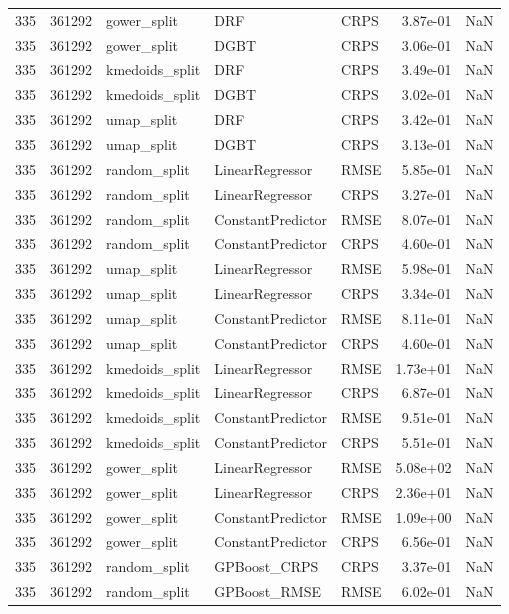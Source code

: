 \begin{tabular}{rrlllrr}
335 & 361292 & gower\_split & DRF & CRPS & 3.87e-01 & NaN \\
335 & 361292 & gower\_split & DGBT & CRPS & 3.06e-01 & NaN \\
335 & 361292 & kmedoids\_split & DRF & CRPS & 3.49e-01 & NaN \\
335 & 361292 & kmedoids\_split & DGBT & CRPS & 3.02e-01 & NaN \\
335 & 361292 & umap\_split & DRF & CRPS & 3.42e-01 & NaN \\
335 & 361292 & umap\_split & DGBT & CRPS & 3.13e-01 & NaN \\
335 & 361292 & random\_split & LinearRegressor & RMSE & 5.85e-01 & NaN \\
335 & 361292 & random\_split & LinearRegressor & CRPS & 3.27e-01 & NaN \\
335 & 361292 & random\_split & ConstantPredictor & RMSE & 8.07e-01 & NaN \\
335 & 361292 & random\_split & ConstantPredictor & CRPS & 4.60e-01 & NaN \\
335 & 361292 & umap\_split & LinearRegressor & RMSE & 5.98e-01 & NaN \\
335 & 361292 & umap\_split & LinearRegressor & CRPS & 3.34e-01 & NaN \\
335 & 361292 & umap\_split & ConstantPredictor & RMSE & 8.11e-01 & NaN \\
335 & 361292 & umap\_split & ConstantPredictor & CRPS & 4.60e-01 & NaN \\
335 & 361292 & kmedoids\_split & LinearRegressor & RMSE & 1.73e+01 & NaN \\
335 & 361292 & kmedoids\_split & LinearRegressor & CRPS & 6.87e-01 & NaN \\
335 & 361292 & kmedoids\_split & ConstantPredictor & RMSE & 9.51e-01 & NaN \\
335 & 361292 & kmedoids\_split & ConstantPredictor & CRPS & 5.51e-01 & NaN \\
335 & 361292 & gower\_split & LinearRegressor & RMSE & 5.08e+02 & NaN \\
335 & 361292 & gower\_split & LinearRegressor & CRPS & 2.36e+01 & NaN \\
335 & 361292 & gower\_split & ConstantPredictor & RMSE & 1.09e+00 & NaN \\
335 & 361292 & gower\_split & ConstantPredictor & CRPS & 6.56e-01 & NaN \\
335 & 361292 & random\_split & GPBoost\_CRPS & CRPS & 3.37e-01 & NaN \\
335 & 361292 & random\_split & GPBoost\_RMSE & RMSE & 6.02e-01 & NaN \\

\end{tabular}
